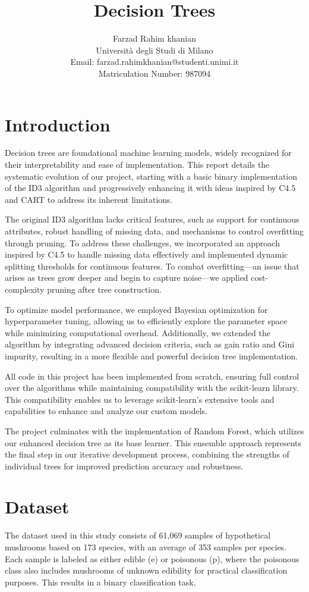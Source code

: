 \documentclass[12pt]{article}
\title{Decision Trees}
\author{Farzad Rahim khanian \\ Università degli Studi di Milano \\ Email: farzad.rahimkhanian@studenti.unimi.it \\ Matriculation Number: 987094}
\date{}
\begin{document}
\maketitle

\section{Introduction}
Decision trees are foundational machine learning models, widely recognized for their interpretability and ease of implementation. This report details the systematic evolution of our project, starting with a basic binary implementation of the ID3 algorithm and progressively enhancing it with ideas inspired by C4.5 and CART to address its inherent limitations.

The original ID3 algorithm lacks critical features, such as support for continuous attributes, robust handling of missing data, and mechanisms to control overfitting through pruning. To address these challenges, we incorporated an approach inspired by C4.5 to handle missing data effectively and implemented dynamic splitting thresholds for continuous features. To combat overfitting—an issue that arises as trees grow deeper and begin to capture noise—we applied cost-complexity pruning after tree construction.

To optimize model performance, we employed Bayesian optimization for hyperparameter tuning, allowing us to efficiently explore the parameter space while minimizing computational overhead. Additionally, we extended the algorithm by integrating advanced decision criteria, such as gain ratio and Gini impurity, resulting in a more flexible and powerful decision tree implementation.

All code in this project has been implemented from scratch, ensuring full control over the algorithms while maintaining compatibility with the scikit-learn library. This compatibility enables us to leverage scikit-learn's extensive tools and capabilities to enhance and analyze our custom models.

The project culminates with the implementation of Random Forest, which utilizes our enhanced decision tree as its base learner. This ensemble approach represents the final step in our iterative development process, combining the strengths of individual trees for improved prediction accuracy and robustness.

\section{Dataset}
The dataset used in this study consists of 61,069 samples of hypothetical mushrooms based on 173 species, with an average of 353 samples per species. Each sample is labeled as either edible (e) or poisonous (p), where the poisonous class also includes mushrooms of unknown edibility for practical classification purposes. This results in a binary classification task.
\end{document}
